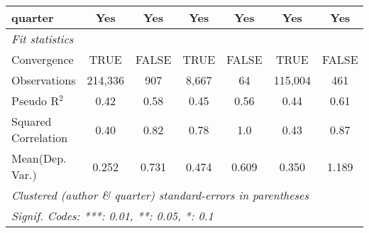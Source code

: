 \begin{tabular}{lcccccc}
   quarter                                                    & Yes           & Yes         & Yes           & Yes           & Yes           & Yes\\  
   \midrule
   \emph{Fit statistics}\\
   Convergence                                                &TRUE           & FALSE       & TRUE          & FALSE         & TRUE          & FALSE\\  
   Observations                                               & 214,336       & 907         & 8,667         & 64            & 115,004       & 461\\  
   Pseudo R$^2$                                               & 0.42          & 0.58        & 0.45          & 0.56          & 0.44          & 0.61\\  
   Squared Correlation                                        & 0.40          & 0.82        & 0.78          & 1.0           & 0.43          & 0.87\\  
Mean(Dep. Var.) & 0.252 & 0.731 & 0.474 & 0.609 & 0.350 & 1.189 \\
   \midrule \midrule
   \multicolumn{7}{l}{\emph{Clustered (author \& quarter) standard-errors in parentheses}}\\
   \multicolumn{7}{l}{\emph{Signif. Codes: ***: 0.01, **: 0.05, *: 0.1}}\\
\end{tabular}
\par\endgroup
